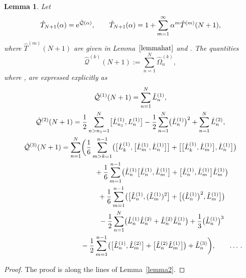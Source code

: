 \documentclass[pdftex]{sigma}
\numberwithin{equation}{section}
\newtheorem{lem}[thm]{Lemma}
\theoremstyle{definition}
\begin{document}
\begin{lem}%
Let
\[
\hat T_{N+1}(\alpha) = {\rm e}^{\hat {\mathcal Q}(\alpha)}, \qquad \hat T_{N+1}(\alpha)=1+\sum_{m=1}^{\infty}\alpha^m \hat T^{(m)}(N+1),
\]
 where $\hat T^{(m)}(N+1)$ are given in Lemma~$\ref{lemmahat}$ and
. The quantities
\[
\hat {\mathcal Q}^{(k)}(N+1):= \sum_{n=1}^N \hat \Omega^{(k)}_n,
\]
where ,
are expressed explicitly as
\begin{gather}
\hat {\mathcal Q}^{(1)}(N+1) = \sum_{n=1}^{N} \hat L^{(1)}_{n},\cr
\hat {\mathcal Q}^{(2)}(N+1) = \frac{1}{2}\sum_{n>n_1=1}^{N} \bigl[ \hat L^{(1)}_{n_1}, L^{(1)}_{n} \bigr] -
\frac{1}{2}\sum_{n=1}^{N} \bigl(\hat L^{(1)}_{n}\bigr)^2+\sum_{n=1}^N \hat L_n^{(2)}, \cr
\hat {\mathcal Q}^{(3)}(N+1) = \sum_{n=1}^N \biggl(\frac{1}{6} \sum_{m>k=1}^{n-1}
\bigl(\bigl[\hat L^{(1)}_{k}, \bigl[\hat L^{(1)}_{m}, \hat L^{(1)}_{n} \bigr] \bigr] +
\bigl[\bigl[\hat L^{(1)}_{k}, \hat L^{(1)}_{m} \bigr], \hat L^{(1)}_{n} \bigr]\bigr) \cr
\hphantom{\hat {\mathcal Q}^{(3)}(N+1) =\sum_{n=1}^N \biggl(}{}
+ \frac{1}{6} \sum_{m=1}^{n-1} \bigl(\hat L^{(1)}_{n}\bigl[\hat L^{(1)}_{n},
\hat L^{(1)}_{m}\bigr] + \bigl[\hat L^{(1)}_{n}, \hat L^{(1)}_{m}\bigr] \hat L^{(1)}_{m}\bigr) \cr
\hphantom{\hat {\mathcal Q}^{(3)}(N+1) =\sum_{n=1}^N \biggl(}{}
+\frac{1}{6} \sum_{m=1}^{n-1} \bigl(\bigl[\hat L^{(1)}_{n}, (\hat L^{(1)}_{m})^2\bigr] +
\bigl[\bigl(\hat L^{(1)}_{n}\bigr)^2, \hat L^{(1)}_{m}\bigr] \bigr)\nonumber\\
\hphantom{\hat {\mathcal Q}^{(3)}(N+1) =\sum_{n=1}^N \biggl(}{}
-\frac{1}{2} \sum_{n=1}^{N} \bigl(\hat L_n^{(1)} \hat L_n^{(2)} +\hat L_n^{(2)}\hat L_n^{(1)} \bigr)+\frac{1}{3} \bigl(\hat L^{(1)}_{n}\bigr)^3 \nonumber\\
\hphantom{\hat {\mathcal Q}^{(3)}(N+1) =\sum_{n=1}^N \biggl(}{}
-\frac{1}{2} \sum_{m=1}^{n-1}\bigl( \bigl[\hat L^{(1)}_n, \hat L_m^{(2)} \bigr] +\bigl[\hat L^{(2)}_n \hat L^{(1)}_m \bigr] \bigr) + \hat L_n^{(3)} \biggr), \qquad \dots\,. \label{QQb}
\end{gather}
\end{lem}
\begin{proof}
The proof is along the lines of Lemma~\ref{lemma2}.
\end{proof}
\end{document}
